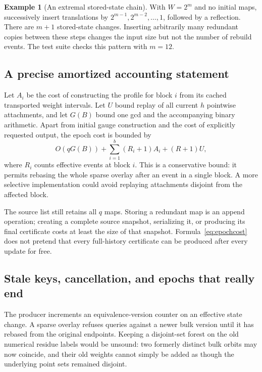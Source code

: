 \documentclass[11pt]{article}
\theoremstyle{definition}
\newtheorem{example}[theorem]{Example}
\begin{document}
\begin{example}[An extremal stored-state chain]
With $W=2^m$ and no initial maps, successively insert translations by $2^{m-1},2^{m-2},\ldots,1$, followed by a reflection. There are $m+1$ stored-state changes. Inserting arbitrarily many redundant copies between these steps changes the input size but not the number of rebuild events. The test suite checks this pattern with $m=12$.
\end{example}

\subsection{A precise amortized accounting statement}
Let $A_i$ be the cost of constructing the profile for block $i$ from its cached transported weight intervals. Let $U$ bound replay of all current $h$ pointwise attachments, and let $G(B)$ bound one gcd and the accompanying binary arithmetic. Apart from initial gauge construction and the cost of explicitly requested output, the epoch cost is bounded by
\begin{equation}
 O(qG(B))+\sum_{i=1}^b(R_i+1)A_i+(R+1)U,
 \label{eq:epochcost}
\end{equation}
where $R_i$ counts effective events at block $i$. This is a conservative bound: it permits rebasing the whole sparse overlay after an event in a single block. A more selective implementation could avoid replaying attachments disjoint from the affected block.

The source list still retains all $q$ maps. Storing a redundant map is an append operation; creating a complete source snapshot, serializing it, or producing its final certificate costs at least the size of that snapshot. Formula~\eqref{eq:epochcost} does not pretend that every full-history certificate can be produced after every update for free.

\subsection{Stale keys, cancellation, and epochs that really end}
The producer increments an equivalence-version counter on an effective state change. A sparse overlay refuses queries against a newer bulk version until it has rebased from the original endpoints. Keeping a disjoint-set forest on the old numerical residue labels would be unsound: two formerly distinct bulk orbits may now coincide, and their old weights cannot simply be added as though the underlying point sets remained disjoint.
\end{document}
